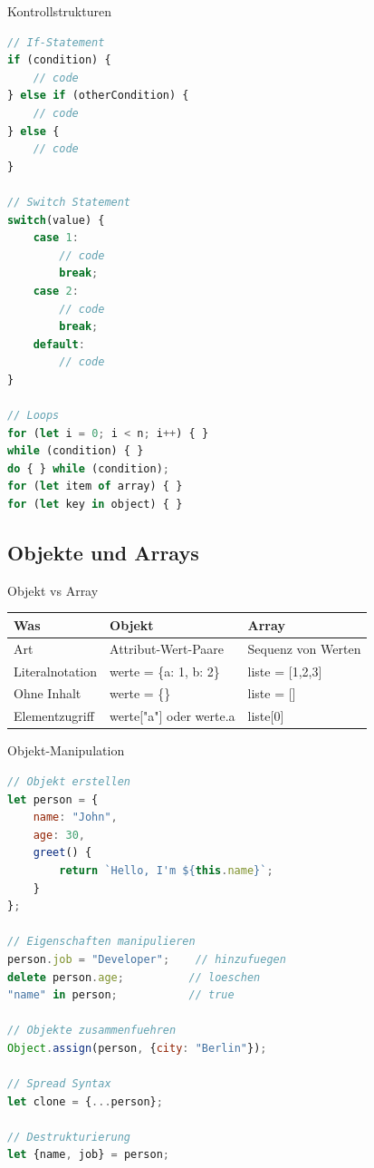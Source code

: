 \begin{KR}{Kontrollstrukturen}
\begin{lstlisting}[language=JavaScript, style=basesmol]
// If-Statement
if (condition) {
    // code
} else if (otherCondition) {
    // code
} else {
    // code
}

// Switch Statement
switch(value) {
    case 1:
        // code
        break;
    case 2:
        // code
        break;
    default:
        // code
}

// Loops
for (let i = 0; i < n; i++) { }
while (condition) { }
do { } while (condition);
for (let item of array) { }
for (let key in object) { }
\end{lstlisting}
\end{KR}

\subsection{Objekte und Arrays}

\begin{theorem}{Objekt vs Array}
    \begin{tabular}{|l|l|l|}
        \hline
        Was & Objekt & Array \\
        \hline
        Art & Attribut-Wert-Paare & Sequenz von Werten \\
        \hline
        Literalnotation & werte = \{a: 1, b: 2\} & liste = [1,2,3] \\
        \hline
        Ohne Inhalt & werte = \{\} & liste = [] \\
        \hline
        Elementzugriff & werte["a"] oder werte.a & liste[0] \\
        \hline
    \end{tabular}
\end{theorem}

\begin{KR}{Objekt-Manipulation}
\begin{lstlisting}[language=JavaScript, style=basesmol]
// Objekt erstellen
let person = {
    name: "John",
    age: 30,
    greet() {
        return `Hello, I'm ${this.name}`;
    }
};

// Eigenschaften manipulieren
person.job = "Developer";    // hinzufuegen
delete person.age;          // loeschen
"name" in person;           // true

// Objekte zusammenfuehren
Object.assign(person, {city: "Berlin"});

// Spread Syntax
let clone = {...person};

// Destrukturierung
let {name, job} = person;
\end{lstlisting}
\end{KR}

